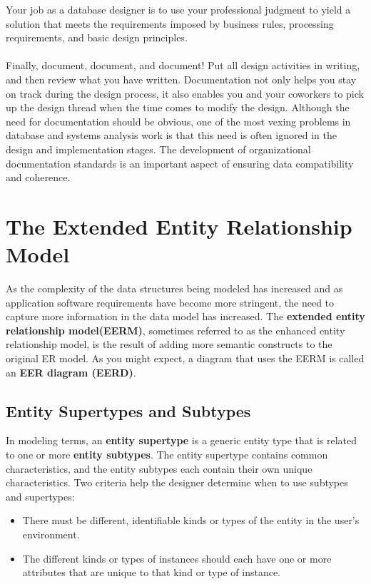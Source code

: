 \documentclass[a4paper, 12pt, titlepage]{report}
\begin{document}
{Your job as a database designer is to use your professional judgment to yield a solution that meets the requirements imposed by business rules, processing requirements, and basic design principles.\\\\
Finally, document, document, and document! Put all design activities in writing, and then review what you have written. Documentation not only helps you stay on track
during the design process, it also enables you and your coworkers to pick up the design thread when the time comes to modify the design. Although the need for documentation should be obvious, one of the most vexing problems in database and systems analysis work is that this need is often ignored in the design and implementation stages. The development of organizational documentation standards is an important aspect of ensuring data compatibility and coherence.
\section{The Extended Entity Relationship Model}
As the complexity of the data structures being modeled has increased and as application software requirements have become more stringent, the need to capture more information in the data model has increased. The \textbf{extended entity relationship model(EERM)}, sometimes referred to as the enhanced entity relationship model, is the result of adding more semantic constructs to the original ER model. As you might expect, a diagram that uses the EERM is called an \textbf{EER diagram (EERD)}. 
\subsection{Entity Supertypes and Subtypes}
In modeling terms, an \textbf{entity supertype} is a generic entity type that is related to one or more \textbf{entity subtypes}. The entity supertype contains common characteristics, and the entity subtypes each contain their own unique characteristics. Two criteria help the designer determine when to use subtypes and supertypes:
\begin{itemize}
\item There must be different, identifiable kinds or types of the entity in the user’s environment.
\item The different kinds or types of instances should each have one or more attributes that are unique to that kind or type of instance.
\end{itemize}
}
\end{document}
